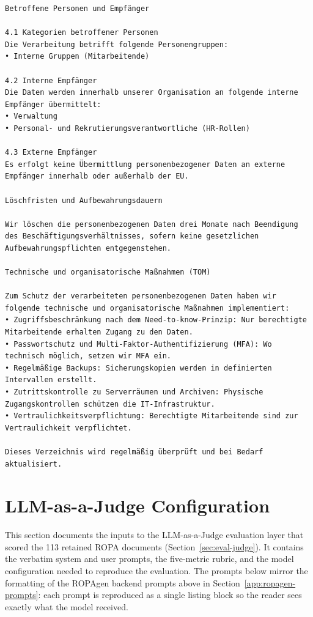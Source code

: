 \begin{lstlisting}
Betroffene Personen und Empfänger

4.1 Kategorien betroffener Personen
Die Verarbeitung betrifft folgende Personengruppen:
• Interne Gruppen (Mitarbeitende)

4.2 Interne Empfänger
Die Daten werden innerhalb unserer Organisation an folgende interne Empfänger übermittelt:
• Verwaltung
• Personal- und Rekrutierungsverantwortliche (HR-Rollen)

4.3 Externe Empfänger
Es erfolgt keine Übermittlung personenbezogener Daten an externe Empfänger innerhalb oder außerhalb der EU.

Löschfristen und Aufbewahrungsdauern

Wir löschen die personenbezogenen Daten drei Monate nach Beendigung des Beschäftigungsverhältnisses, sofern keine gesetzlichen Aufbewahrungspflichten entgegenstehen.

Technische und organisatorische Maßnahmen (TOM)

Zum Schutz der verarbeiteten personenbezogenen Daten haben wir folgende technische und organisatorische Maßnahmen implementiert:
• Zugriffsbeschränkung nach dem Need-to-know-Prinzip: Nur berechtigte Mitarbeitende erhalten Zugang zu den Daten.
• Passwortschutz und Multi-Faktor-Authentifizierung (MFA): Wo technisch möglich, setzen wir MFA ein.
• Regelmäßige Backups: Sicherungskopien werden in definierten Intervallen erstellt.
• Zutrittskontrolle zu Serverräumen und Archiven: Physische Zugangskontrollen schützen die IT-Infrastruktur.
• Vertraulichkeitsverpflichtung: Berechtigte Mitarbeitende sind zur Vertraulichkeit verpflichtet.

Dieses Verzeichnis wird regelmäßig überprüft und bei Bedarf aktualisiert.

\end{lstlisting}

\section{LLM-as-a-Judge Configuration}
\label{app:judge}

This section documents the inputs to the LLM-as-a-Judge evaluation layer that scored the 113 retained ROPA documents (Section~\ref{sec:eval-judge}). It contains the verbatim system and user prompts, the five-metric rubric, and the model configuration needed to reproduce the evaluation. The prompts below mirror the formatting of the ROPAgen backend prompts above in Section~\ref{app:ropagen-prompts}: each prompt is reproduced as a single listing block so the reader sees exactly what the model received.

